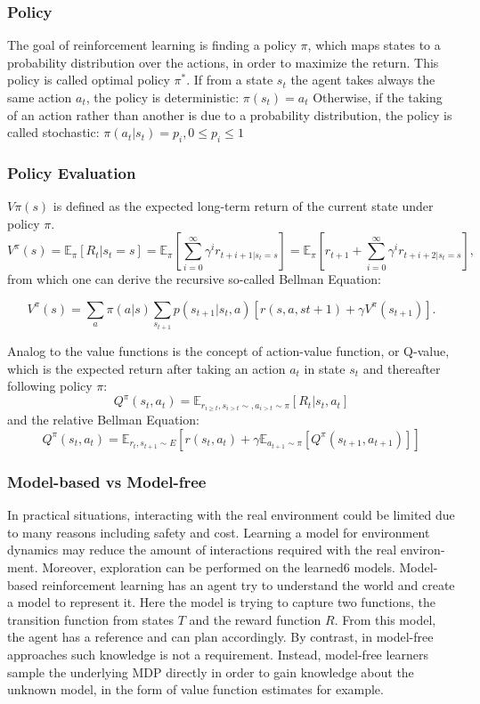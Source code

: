 \subsubsection{Policy}
The goal of reinforcement learning is finding a policy \(\pi\), which maps states to a probability distribution over the actions, in order to maximize the return. This policy is called optimal policy \(\pi^*\).
If from a state \(s_t\) the agent takes always the same action \(a_t\), the policy is deterministic:
\(\pi(s_t) = a_t\)
Otherwise, if the taking of an action rather than another is due to a probability distribution, the policy is called stochastic:
\(\pi(a_t|s_t) = p_i, 0 \leq p_i \leq 1\)


\subsubsection{Policy Evaluation}
$V\pi(s)$ is defined as the expected long-term return of the current state under policy $\pi$. 
\[V^\pi(s) = \mathbb{E}_\pi{\left[R_t|s_t=s\right]}= \mathbb{E}_\pi\left[\sum^{\infty}_{i=0}\gamma^ir_{t+i+1|s_t=s}\right] = \mathbb{E}_\pi\left[r_{t+1} + \sum^{\infty}_{i=0}\gamma^ir_{t+i+2|s_t=s}\right],\]
from which one can derive the recursive so-called Bellman Equation:

\[V^\pi(s) = \sum_a\pi(a|s)\sum_{s_{t+1}}p(s_{t+1}|s_t,a)[r(s,a,s{t+1})+\gamma V^\pi(s_{t+1})].\]

Analog to the value functions is the concept of action-value function, or Q-value, which is the expected return after taking an action \(a_t\) in state \(s_t\) and thereafter following policy \(\pi\):
\[Q^\pi(s_t,a_t)=\mathbb{E}_{r_{i \geq t},s_{i>t} \sim ,a_{i>t} \sim \pi}[R_t|s_t,a_t]\]
and the relative Bellman Equation:
\[Q^\pi(s_t,a_t)=\mathbb{E}_{r_t,s_{t+1} \sim E }\left[ r(s_t,a_t) + \gamma \mathbb{E}_{a_{t+1} \sim \pi}\left[Q^\pi (s_{t+1},a_{t+1})\right]\right]\]


\subsubsection{Model-based vs Model-free}
In practical situations, interacting with the real environment
could be limited due to many reasons including safety and
cost. Learning a model for environment dynamics may reduce
the amount of interactions required with the real environ-
ment. Moreover, exploration can be performed on the learned6
models.
Model-based reinforcement learning has an agent try to understand the world and create a model to represent it. Here the model is trying to capture two functions, the transition function from states $T$ and the reward function $R$. From this model, the agent has a reference and can plan accordingly.
By contrast, in model-free approaches such knowledge
is not a requirement. Instead, model-free learners sample the
underlying MDP directly in order to gain knowledge about
the unknown model, in the form of value function estimates
for example. 


